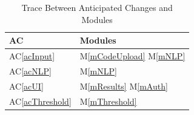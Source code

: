 \documentclass[12pt, titlepage]{article}
\newcommand{\acref}[1]{AC\ref{#1}}
\newcommand{\mref}[1]{M\ref{#1}}
\begin{document}
\begin{table}[H]
  \centering
  \begin{tabular}{p{} p{}}
  \toprule
  \textbf{AC} & \textbf{Modules}\\
  \midrule
  \acref{acInput} & \mref{mCodeUpload} \mref{mNLP}\\
  \acref{acNLP} & \mref{mNLP} \\
  \acref{acUI} & \mref{mResults} \mref{mAuth} \\
  \acref{acThreshold} & \mref{mThreshold} \\
  \bottomrule
  \end{tabular}
  \caption{Trace Between Anticipated Changes and Modules}
  \label{TblACT}
\end{table}
\end{document}
